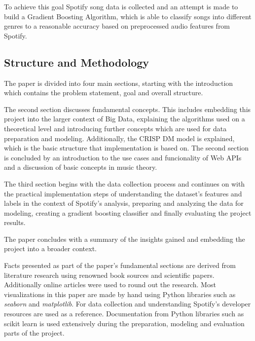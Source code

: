 To achieve this goal Spotify song data is collected and an attempt is made to build a Gradient Boosting
Algorithm, which is able to classify songs into different genres to a reasonable accuracy based on preprocessed
audio features from Spotify.

\subsection{Structure and Methodology}

The paper is divided into four main sections, starting with the introduction which contains the problem statement, goal and overall structure.

The second section discusses fundamental concepts. This includes embedding this project into the larger context of Big Data,
explaining the algorithms used on a theoretical level and introducing further concepts which are used for data preparation and modeling.
Additionally, the \ac{CRISP DM} model is explained, which is the basic structure that implementation is based on.
The second section is concluded by an introduction to the use cases and funcionality of Web \acp{API} and a discussion of basic concepts
in music theory.

The third section begins with the data collection process and continues on with the practical implementation steps 
of understanding the dataset's features and labels in the context of Spotify's analysis, preparing and analyzing the data for modeling, creating a
gradient boosting classifier and finally evaluating the project results.

The paper concludes with a summary of the insights gained and embedding the project into a broader context.

Facts presented as part of the paper's fundamental sections are derived from literature research using renowned book sources and
scientific papers. Additionally online articles were used to round out the research.
Most visualizations in this paper are made by hand using Python libraries such as \emph{seaborn} and \emph{matplotlib}.
For data collection and understanding Spotify's developer resources are used as a reference.
Documentation from Python libraries such as scikit learn is used extensively during the preparation, modeling and evaluation parts
of the project.



